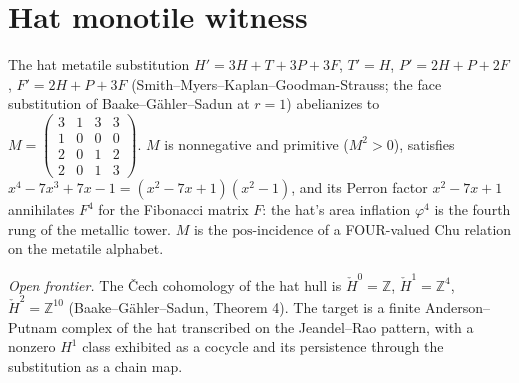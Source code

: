 \section{Hat monotile witness}

\begin{theorem}\label{thm:hat-metatile-substitution}\leanok{}
The hat metatile substitution $H'=3H+T+3P+3F$, $T'=H$, $P'=2H+P+2F$, $F'=2H+P+3F$ (Smith--Myers--Kaplan--Goodman-Strauss; the face substitution of Baake--G\"ahler--Sadun at $r=1$) abelianizes to
$M=\begin{pmatrix}3&1&3&3\\1&0&0&0\\2&0&1&2\\2&0&1&3\end{pmatrix}$.
$M$ is nonnegative and primitive ($M^2>0$), satisfies $x^4-7x^3+7x-1=(x^2-7x+1)(x^2-1)$, and its Perron factor $x^2-7x+1$ annihilates $F^4$ for the Fibonacci matrix $F$: the hat's area inflation $\varphi^4$ is the fourth rung of the metallic tower. $M$ is the $\mathrm{pos}$-incidence of a FOUR-valued Chu relation on the metatile alphabet.
\end{theorem}

\begin{theorem}[A finite cohomology witness for the hat hull ($\check H^1=\mathbb{Z}^4$)]\label{thm:hat-hull-cohomology}\notready{}
\emph{Open frontier.} The \v{C}ech cohomology of the hat hull is $\check H^0=\mathbb{Z}$, $\check H^1=\mathbb{Z}^4$, $\check H^2=\mathbb{Z}^{10}$ (Baake--G\"ahler--Sadun, Theorem 4). The target is a finite Anderson--Putnam complex of the hat transcribed on the Jeandel--Rao pattern, with a nonzero $H^1$ class exhibited as a cocycle and its persistence through the substitution as a chain map.
\end{theorem}
